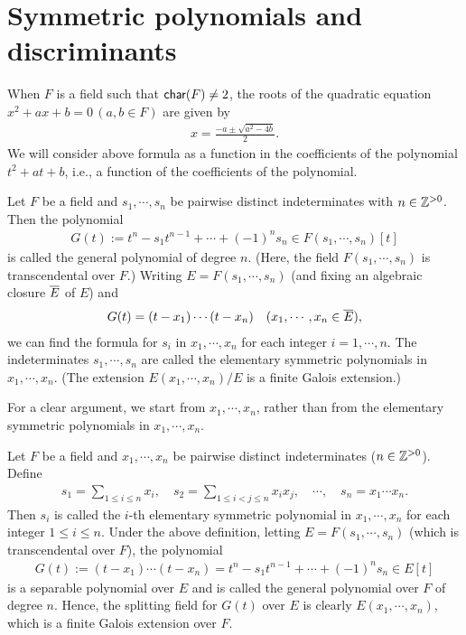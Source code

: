 \section{Symmetric polynomials and discriminants}

\begin{rmk}
    When $F$ is a field such that ${\textsf{char}({F})}\neq 2$, the roots of the quadratic equation $x^2+ax+b=0\,(a, b\in F)$ are given by
    \begin{align*}
        x=\frac{-a\pm\sqrt{a^2-4b}}{2}.
    \end{align*}
    We will consider above formula as a function in the coefficients of the polynomial $t^2+at+b$, i.e., a function of the coefficients of the polynomial.
\end{rmk}

\begin{obs}
    Let $F$ be a field and $s_1, \cdots, s_n$ be pairwise distinct indeterminates with $n\in{\mathbb{Z}}^{>0}$.
    Then the polynomial
    \begin{align*}
        G(t):=t^n-s_1t^{n-1}+\cdots+(-1)^ns_n\in F(s_1, \cdots, s_n)[t]
    \end{align*}
    is called the general polynomial of degree $n$.
    (Here, the field $F(s_1, \cdots, s_n)$ is transcendental over $F$.)
    Writing $E=F(s_1, \cdots, s_n)$ (and fixing an algebraic closure $\overline{E}$ of $E$) and
    \begin{align*}
        G(t)=(t-x_1)\cdots(t-x_n)\quad (x_1, \cdots, x_n\in \overline{E}),
    \end{align*}
    we can find the formula for $s_i$ in $x_1, \cdots, x_n$ for each integer $i=1, \cdots, n$.
    The indeterminates $s_1, \cdots, s_n$ are called the elementary symmetric polynomials in $x_1, \cdots, x_n$.
    (The extension $E(x_1, \cdots, x_n)/E$ is a finite Galois extension.)
\end{obs}
For a clear argument, we start from $x_1, \cdots, x_n$, rather than from the elementary symmetric polynomials in $x_1, \cdots, x_n$.
\begin{defi}
    Let $F$ be a field and $x_1, \cdots, x_n$ be pairwise distinct indeterminates ($n\in{\mathbb{Z}}^{>0}$).
    Define
    \begin{align*}
        s_1=\sum_{1\leq i\leq n} x_i,\quad s_2=\sum_{1\leq i<j\leq n} x_ix_j,\quad\cdots, \quad s_n=x_1\cdots x_n.
    \end{align*}
    Then $s_i$ is called the $i$-th elementary symmetric polynomial in $x_1, \cdots, x_n$ for each integer $1\leq i\leq n$.
    Under the above definition, letting $E=F(s_1, \cdots, s_n)$ (which is transcendental over $F$), the polynomial
    \begin{align*}
        G(t):=(t-x_1)\cdots(t-x_n)=t^n-s_1t^{n-1}+\cdots+(-1)^ns_n\in E[t]
    \end{align*}
    is a separable polynomial over $E$ and is called the general polynomial over $F$ of degree $n$.
    Hence, the splitting field for $G(t)$ over $E$ is clearly $E(x_1, \cdots, x_n)$, which is a finite Galois extension over $F$.
\end{defi}

